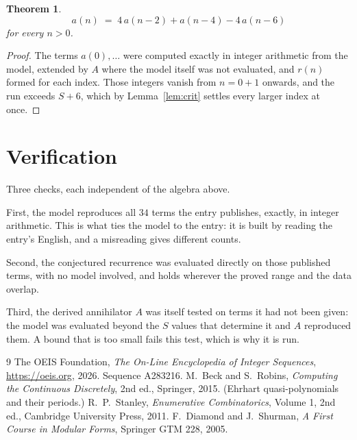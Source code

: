 \documentclass[11pt,a4paper]{article}
\theoremstyle{plain}
\newtheorem{theorem}{Theorem}
\theoremstyle{definition}
\begin{document}
\begin{theorem}
\[
a(n)\;=\;4\,a(n-2) + a(n-4) - 4\,a(n-6)
\]
for every $n>0$.
\end{theorem}

\begin{proof}
The terms $a(0),\dots$ were computed exactly in integer arithmetic from the model, extended by
$A$ where the model itself was not evaluated, and $r(n)$ formed for each index. Those integers
vanish from $n=0+1$ onwards, and the run exceeds $S+6$, which by
Lemma~\ref{lem:crit} settles every larger index at once.
\end{proof}

\section{Verification}

Three checks, each independent of the algebra above.

First, the model reproduces all $34$ terms the entry publishes, exactly, in integer
arithmetic. This is what ties the model to the entry: it is built by reading the entry's
English, and a misreading gives different counts.

Second, the conjectured recurrence was evaluated directly on those published terms, with no
model involved, and holds wherever the proved range and the data overlap.

Third, the derived annihilator $A$ was itself tested on terms it had not been given: the model
was evaluated beyond the $S$ values that determine it and $A$ reproduced them. A bound that is
too small fails this test, which is why it is run.

\begin{thebibliography}{9}
 The OEIS Foundation, \emph{The On-Line Encyclopedia of Integer
Sequences}, \url{https://oeis.org}, 2026. Sequence A283216.
 M.~Beck and S.~Robins, \emph{Computing the Continuous Discretely},
2nd ed., Springer, 2015. (Ehrhart quasi-polynomials and their periods.)
 R.~P.~Stanley, \emph{Enumerative Combinatorics}, Volume 1, 2nd ed.,
Cambridge University Press, 2011.
 F.~Diamond and J.~Shurman, \emph{A First Course in Modular Forms},
Springer GTM 228, 2005.
\end{thebibliography}
\end{document}
